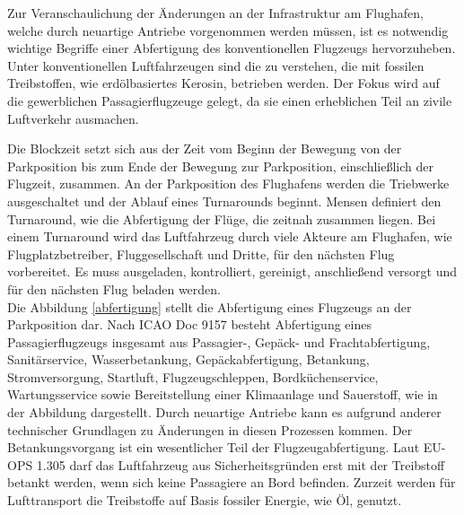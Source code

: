 Zur Veranschaulichung der Änderungen an der Infrastruktur am Flughafen, 
welche durch neuartige Antriebe vorgenommen werden müssen, ist es notwendig 
wichtige Begriffe einer Abfertigung des konventionellen Flugzeugs hervorzuheben. 
Unter konventionellen Luftfahrzeugen sind die zu verstehen,
die mit fossilen Treibstoffen, wie erdölbasiertes Kerosin, betrieben werden. 
Der Fokus wird auf die gewerblichen Passagierflugzeuge gelegt,
da sie einen erheblichen Teil an zivile Luftverkehr ausmachen. %

Die Blockzeit setzt sich aus der Zeit vom Beginn der Bewegung von der Parkposition 
bis zum Ende der Bewegung zur Parkposition, einschließlich der Flugzeit, zusammen.
An der Parkposition des Flughafens werden die Triebwerke ausgeschaltet 
und der Ablauf eines Turnarounds beginnt. 
Mensen \cite{mensen2013handbuch} definiert den Turnaround, 
wie die Abfertigung der Flüge, die zeitnah zusammen liegen. %
Bei einem Turnaround wird das Luftfahrzeug durch viele Akteure am Flughafen, 
wie Flugplatzbetreiber, Fluggesellschaft und Dritte, für den nächsten Flug vorbereitet. 
Es muss ausgeladen, kontrolliert, gereinigt, anschließend versorgt 
und für den nächsten Flug beladen werden.\\

Die Abbildung \ref{abfertigung} stellt die Abfertigung eines Flugzeugs an der Parkposition dar.
Nach ICAO Doc 9157 besteht Abfertigung eines Passagierflugzeugs 
insgesamt aus Passagier-, Gepäck- und Frachtabfertigung, Sanitärservice, Wasserbetankung, 
Gepäckabfertigung, Betankung, Stromversorgung, Startluft, Flugzeugschleppen, 
Bordküchenservice, Wartungsservice sowie Bereitstellung einer Klimaanlage und Sauerstoff,
wie in der Abbildung dargestellt. Durch neuartige Antriebe kann es aufgrund anderer 
technischer Grundlagen zu Änderungen in diesen Prozessen kommen.
%
Der Betankungsvorgang ist ein wesentlicher Teil der Flugzeugabfertigung. 
Laut EU-OPS 1.305 darf das Luftfahrzeug aus Sicherheitsgründen erst mit der Treibstoff betankt werden, 
wenn sich keine Passagiere an Bord befinden. 
Zurzeit werden für Lufttransport die Treibstoffe auf Basis fossiler Energie, wie Öl, genutzt. 
%


